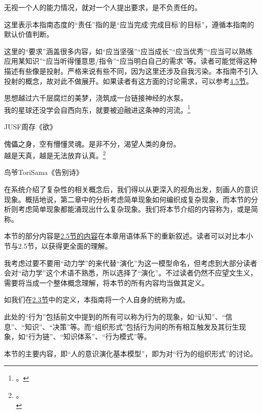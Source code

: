 无视一个人的能力情况，就对一个人提出要求，是不负责任的。
\begin{explain}
这里表示本指南态度的“责任”指的是“应当完成‘完成目标’的目标”，遵循本指南的默认价值判断。

这里的“要求”涵盖很多内容，如“应当坚强”“应当成长”“应当优秀”“应当可以熟练应用某知识”“应当听得懂意思/指令”“应当明白自己的需求”等。读者可能觉得这种描述有些像是投射。严格来说有些不同，因为这里还涉及自我污染。本指南不引入投射的概念，故对此不做展开。如果读者有这方面的讨论需求，可以参考\hyperref[sec:指挥]{4.5节}。
\end{explain}

\hfill\begin{minipage}{0.55\textwidth}
\fontsize{8pt}{12pt}\selectfont\fontsize{8pt}{12pt}
\raggedright 思想越过六千层腐烂的美梦，浇筑成一台链接神经的水泵。\\
我的星球还没学会自西向东，就要被迫融进这条神的河流。\footnote{\another{}。}

\raggedleft JUSF周存《欲》

\raggedright 傀儡之身，空有懵懂灵魂。是非不分，渴望人类的身份。\\
越是天真，越是无法放弃认真。\footnote{\another{}。\\}

\raggedleft 鸟爷ToriSama《告别诗》
\end{minipage}

在系统介绍了复杂性的相关概念后，我们得以从更深入的视角出发，刻画人的意识现象。概括地说，第二章中的分析考虑简单现象如何编织成复杂现象，而本节的分析则考虑简单现象都能涌现出什么复杂现象。我们将本节介绍的内容称为，或是简称。
\begin{explain}
本节的部分内容是\hyperref[sec:原生家庭]{2.5节的内容}在本章用语体系下的重新叙述。读者可以对比本小节与2.5节，以获得更全面的理解。

我考虑过要不要用“动力学”的来代替“演化”为这一模型命名，但考虑到大部分读者会对“动力学”这个术语不熟悉，所以选择了“演化”。不过读者仍然不应望文生义，需要将当成一个整体概念理解，将本节的所有内容均当做其定义。
\end{explain}
如我们在\hyperref[sec:意识与自我]{2.3节}中的定义，本指南将一个人自身的统称为或。
\begin{explain}
此处的“行为”包括前文中提到的所有可以称为行为的现象，如“认知”、“信息”、“知识”、“决策”等。而“组织形式”包括行为间的所有相互触发及其衍生现象，如“行为链”、“知识体系”、“行为模式”等。

本节的主要内容，即“人的意识演化基本模型”，即为对“行为的组织形式”的讨论。
\end{explain}

